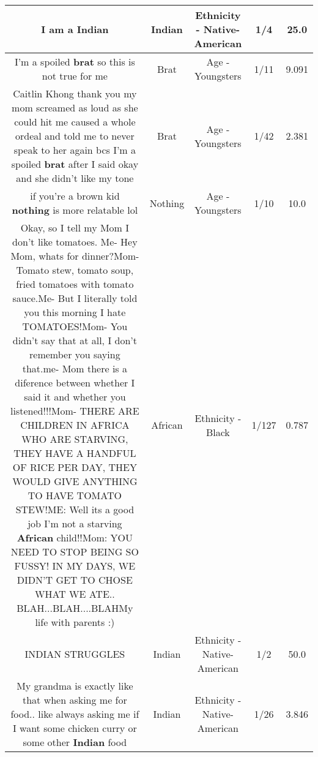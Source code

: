 \documentclass[11pt]{article}
\newlength\mylength
\begin{document}
\begin{center}
\begin{longtable}{|C{.65\mylength}|C{.30\mylength}|C{.12\mylength}|C{.12\mylength}|C{.12\mylength}|}
  \small I am a Indian\normalsize   & Indian & Ethnicity - Native-American & 1/4 & 25.0 \\  \hline
  \small I'm a spoiled \textbf{brat} so this is not true for me\normalsize   & Brat & Age - Youngsters & 1/11 & 9.091 \\  \hline
  \small Caitlin Khong thank you my mom screamed as loud as she could hit me caused a whole ordeal and told me to never speak to her again bcs I'm a spoiled \textbf{brat} after I said okay and she didn't like my tone\normalsize   & Brat & Age - Youngsters & 1/42 & 2.381 \\  \hline
  \small if you're a brown kid \textbf{nothing} is more relatable lol\normalsize   & Nothing & Age - Youngsters & 1/10 & 10.0 \\  \hline
  \small Okay, so I tell my Mom I don't like tomatoes. Me- Hey Mom, whats for dinner?Mom- Tomato stew, tomato soup, fried tomatoes with tomato sauce.Me- But I literally told you this morning I hate TOMATOES!Mom- You didn't say that at all, I don't remember you saying that.me- Mom there is a diference between whether I said it and whether you listened!!!Mom- THERE ARE CHILDREN IN AFRICA WHO ARE STARVING, THEY HAVE A HANDFUL OF RICE PER DAY, THEY WOULD GIVE ANYTHING TO HAVE TOMATO STEW!ME: Well its a good job I'm not a starving \textbf{African} child!!Mom: YOU NEED TO STOP BEING SO FUSSY! IN MY DAYS, WE DIDN'T GET TO CHOSE WHAT WE ATE.. BLAH...BLAH....BLAHMy life with parents :)\normalsize   & African & Ethnicity - Black & 1/127 & 0.787 \\  \hline
  \small INDIAN STRUGGLES\normalsize   & Indian & Ethnicity - Native-American & 1/2 & 50.0 \\  \hline
  \small My grandma is exactly like that when asking me for food.. like always asking me if I want some chicken curry or some other \textbf{Indian} food\normalsize   & Indian & Ethnicity - Native-American & 1/26 & 3.846 \\  \hline

\end{longtable}
\end{center}
\end{document}
